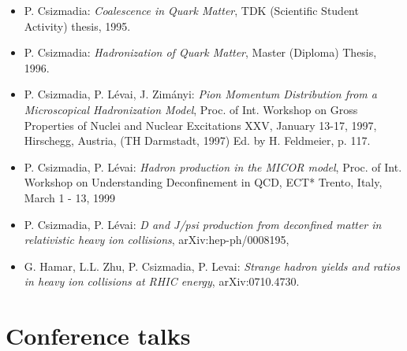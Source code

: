 \documentclass{article}[12pt]
\begin{document}
\begin{itemize}
\item P. Csizmadia: {\it Coalescence in Quark Matter},
      TDK (Scientific Student Activity) thesis, 1995.

\item P. Csizmadia: {\it Hadronization of Quark Matter},
      Master (Diploma) Thesis, 1996.

\item P. Csizmadia, P. L{\'e}vai, J. Zim{\'a}nyi: {\it Pion Momentum
      Distribution from a Microscopical Hadronization Model}, Proc. of Int.
      Workshop on Gross Properties of Nuclei and Nuclear Excitations XXV,
      January 13-17, 1997, Hirschegg, Austria, (TH Darmstadt, 1997)
      Ed. by H. Feldmeier, p. 117.

\item P. Csizmadia, P. L{\'e}vai: {\it Hadron production in the MICOR model},
      Proc. of Int. Workshop on Understanding Deconfinement in QCD,
      ECT* Trento, Italy, March 1 - 13, 1999

\item P. Csizmadia, P. L{\'e}vai:
      {\it D and J/psi production from deconfined matter in
      relativistic heavy ion collisions}, arXiv:hep-ph/0008195,

\item G. Hamar, L.L. Zhu, P. Csizmadia, P. Levai: {\it Strange hadron yields
      and ratios in heavy ion collisions at RHIC energy}, arXiv:0710.4730.

\end{itemize}

\section*{Conference talks}
\end{document}
